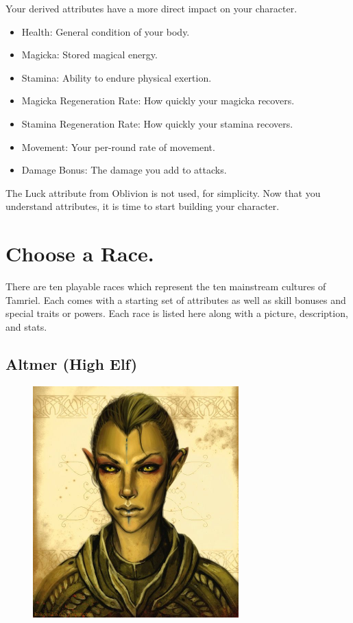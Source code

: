 \documentclass[12pt]{book}
\begin{document}
\noindent
Your derived attributes have a more direct impact on your character.
\begin{itemize}
	\item Health: General condition of your body.
	\item Magicka: Stored magical energy.
	\item Stamina: Ability to endure physical exertion.
	\item Magicka Regeneration Rate: How quickly your magicka recovers.
	\item Stamina Regeneration Rate: How quickly your stamina recovers.
	\item Movement: Your per-round rate of movement.
	\item Damage Bonus: The damage you add to attacks.
\end{itemize}
The Luck attribute from Oblivion is not used, for simplicity. Now that you understand attributes, it is time to start building your character.\\

\section{Choose a Race.}
There are ten playable races which represent the ten mainstream cultures of Tamriel. Each comes with a starting set of attributes as well as skill bonuses and special traits or powers. Each race is listed here along with a picture, description, and stats.\\

\subsection{Altmer (High Elf)}
\begin{figure}
	\includegraphics[width=\textwidth]{Altmer.png}
\end{figure}
\end{document}
